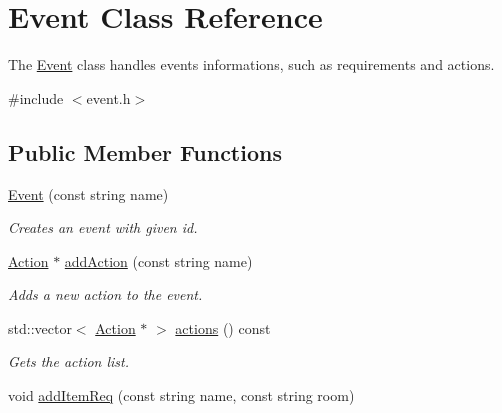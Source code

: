 \hypertarget{classEvent}{
\section{Event Class Reference}
\label{classEvent}
}


The \hyperlink{classEvent}{Event} class handles events informations, such as requirements and actions.  




{\ttfamily \#include $<$event.h$>$}

\subsection*{Public Member Functions}
\begin{DoxyCompactItemize}
\item 
\hypertarget{classEvent_a4c24a24cb3b0108631632114e6c19e65}{
\hyperlink{classEvent_a4c24a24cb3b0108631632114e6c19e65}{Event} (const string name)}
\label{classEvent_a4c24a24cb3b0108631632114e6c19e65}

\begin{DoxyCompactList}\small\item\em Creates an event with given id. \item\end{DoxyCompactList}\item 
\hypertarget{classEvent_a9a0b948b36af48f4b1ba6684260e716e}{
\hyperlink{classAction}{Action} $\ast$ \hyperlink{classEvent_a9a0b948b36af48f4b1ba6684260e716e}{addAction} (const string name)}
\label{classEvent_a9a0b948b36af48f4b1ba6684260e716e}

\begin{DoxyCompactList}\small\item\em Adds a new action to the event. \item\end{DoxyCompactList}\item 
\hypertarget{classEvent_a699266ed7e70492008096568e69417e0}{
std::vector$<$ \hyperlink{classAction}{Action} $\ast$ $>$ \hyperlink{classEvent_a699266ed7e70492008096568e69417e0}{actions} () const }
\label{classEvent_a699266ed7e70492008096568e69417e0}

\begin{DoxyCompactList}\small\item\em Gets the action list. \item\end{DoxyCompactList}\item 
\hypertarget{classEvent_a0cc0a16f73ac192068fd51831c2b77be}{
void \hyperlink{classEvent_a0cc0a16f73ac192068fd51831c2b77be}{addItemReq} (const string name, const string room)}
\label{classEvent_a0cc0a16f73ac192068fd51831c2b77be}


\end{DoxyCompactItemize}
